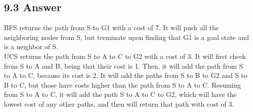 \documentclass{article}
\begin{document}
\subsection*{9.3 Answer}
BFS returns the path from S to G1 with a cost of 7. It will push all the neighboring nodes from S, but terminate upon finding that G1 is a goal state and is a neighbor of S.
\\ UCS returns the path from S to A to C to G2 with a cost of 3. It will first check from S to A and B, being that their cost is 1. Then, it will add the path from S to A to C, because its cost is 2. It will add the paths from S to B to G2 and S to B to C, but those have costs higher than the path from S to A to C. Resuming from S to A to C, it will add the path S to A to C to G2, which will have the lowest cost of any other paths, and then will return that path with cost of 3. 
\newpage
\end{document}
